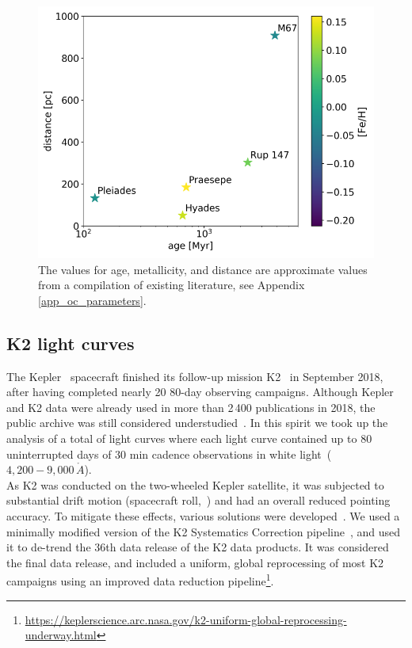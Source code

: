 \documentclass{aa}
\begin{document}
     \begin{figure}
            \includegraphics[width=\hsize]{pics/clusters/openclusters_logage_vs_distance.png}
         \caption{The values for age, metallicity, and distance are approximate values from a compilation of existing literature, see Appendix \ref{app_oc_parameters}.}
         \label{OCs}
   \end{figure}

\subsection{K2 light curves}
The Kepler~\citep{koch_kepler_2010} spacecraft finished its follow-up mission K2~\citep{howell_k2_2014} in September 2018, after having completed nearly 20 80-day observing campaigns. Although Kepler and K2 data were already used in more than 2\,400 publications in 2018, the public archive was still considered understudied~\citep{barentsen_retirement_opportunities_2018}. In this spirit we took up the analysis of a total of light curves where each light curve contained up to $80$ uninterrupted days of $30$ min cadence observations in white light~($4,200-9,000\,\mathring{A}$).
\\
As K2 was conducted on the two-wheeled Kepler satellite, it was subjected to substantial drift motion (spacecraft roll,~\citealt{van_cleve_thats_2016}) and had an overall reduced pointing accuracy. To mitigate these effects, various solutions were developed~\citep{vanderburg_k2sff_2014, aigrain_k2sc_2016, luger_everest_2016, luger_everst_2018}. We used a minimally modified version of the K2 Systematics Correction pipeline~\citep{aigrain_k2sc_2016}, and used it to de-trend the 36th data release of the K2 data products. It was considered the final data release, and included a uniform, global reprocessing of most K2 campaigns using an improved data reduction pipeline\footnote{\url{https://keplerscience.arc.nasa.gov/k2-uniform-global-reprocessing-underway.html}}.
\end{document}
